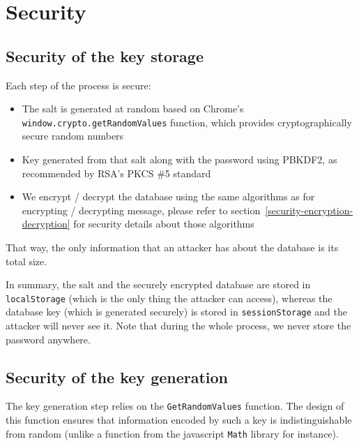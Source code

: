\documentclass[10pt,twocolumn]{article}
\begin{document}
\section{Security}
\label{sec:security}

\subsection{Security of the key storage}

Each step of the process is secure:
\begin{itemize}
  \item The salt is generated at random based on Chrome's \texttt{window.crypto.getRandomValues} function, which provides cryptographically secure random numbers
  \item Key generated from that salt along with the password using PBKDF2, as recommended by RSA's PKCS \#5 standard
  \item We encrypt / decrypt the database using the same algorithms as for encrypting / decrypting message, please refer to section~\ref{security-encryption-decryption} for security details about those algorithms
\end{itemize}

That way, the only information that an attacker has about the database is its total size.

In summary, the salt and the securely encrypted database are stored in \texttt{localStorage} (which is the only thing the attacker can access), whereas the database key (which is generated securely) is stored in \texttt{sessionStorage} and the attacker will never see it. Note that during the whole process, we never store the password anywhere.




\subsection{Security of the key generation}

The key generation step relies on the \texttt{GetRandomValues} function. The design of this function ensures that information encoded by such a key is indistinguishable from random (unlike a function from the javascript \texttt{Math} library for instance).
\end{document}
